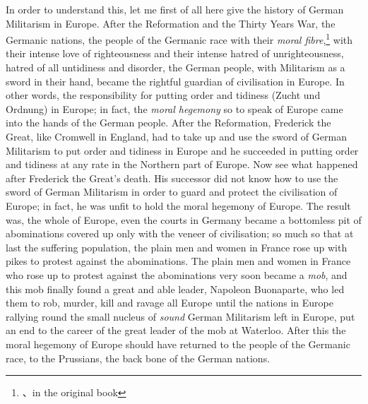 In order to understand this, let me first of all here give the history of German Militarism in Europe.
After the Reformation and the Thirty Years War,  the Germanic nations, the people of the Germanic race with their \emph{moral fibre},\footnote{、in the original book} with their intense love of righteousness and their intense hatred of unrighteousness, hatred of all untidiness and disorder, the German people, with Militarism as a sword in their hand, became the rightful guardian of civilisation in Europe.
In other words, the responsibility for putting order and tidiness (Zucht und Ordnung) in Europe; in fact, the \emph{moral hegemony} so to speak of Europe came into the hands of the German people.
After the Reformation, Frederick the Great,  like Cromwell  in England, had to take up and use the sword of German Militarism to put order and tidiness in Europe and he succeeded in putting order and tidiness at any rate in the Northern part of Europe.
Now see what happened after Frederick the Great's death.
His successor did not know how to use the sword of German Militarism in order to guard and protect the civilisation of Europe; in fact, he was unfit to hold the moral hegemony of Europe. 
The result was, the whole of Europe, even the courts in Germany became a bottomless pit of abominations covered up only with the veneer of civilisation; so much so that at last the suffering population, the plain men and women in France rose up with pikes to protest against the abominations.
The plain men and women in France who rose up to protest against the abominations very soon became a \emph{mob}, and this mob finally found a great and able leader, Napoleon Buonaparte\cite{num6},  who led them to rob, murder, kill and ravage all Europe until the nations in Europe rallying round the small nucleus of \emph{sound} German Militarism left in Europe, put an end to the career of the great leader of the mob at Waterloo. 
After this the moral hegemony of Europe should have returned to the people of the Germanic race, to the Prussians, the back bone  of the German nations.
